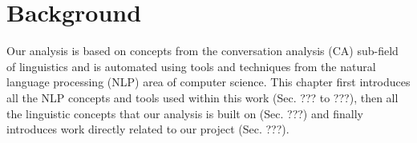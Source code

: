 \chapter{Background \label{cpt: background}}

Our analysis is based on concepts from the conversation analysis (CA) sub-field of linguistics and is automated using tools and techniques from the natural language processing (NLP) area of computer science. This chapter first introduces all the NLP concepts and tools used within this work (Sec. ??? to ???), then all the linguistic concepts that our analysis is built on (Sec. ???) and finally introduces work directly related to our project (Sec. ???).

 
 
 
 
 


